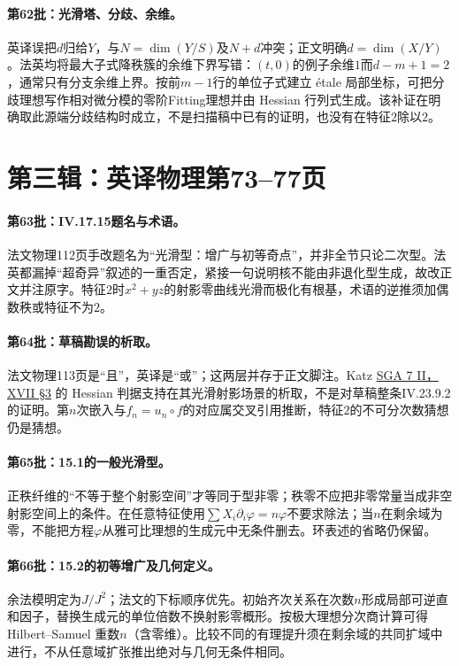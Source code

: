 \documentclass[UTF8,a4paper]{ctexbook}
\begin{document}
\paragraph{第62批：光滑塔、分歧、余维。}
英译误把$d$归给$Y$，与$N=\dim(Y/S)$及$N+d$冲突；正文明确$d=\dim(X/Y)$。法英均将最大子式降秩簇的余维下界写错：$(t,0)$的例子余维$1$而$d-m+1=2$，通常只有分支余维上界。按前$m-1$行的单位子式建立 étale 局部坐标，可把分歧理想写作相对微分模的零阶Fitting理想并由 Hessian 行列式生成。该补证在明确取此源端分歧结构时成立，不是扫描稿中已有的证明，也没有在特征$2$除以$2$。
\section*{第三辑：英译物理第73--77页}
\paragraph{第63批：IV.17.15题名与术语。}
法文物理112页手改题名为“光滑型：增广与初等奇点”，并非全节只论二次型。法英都漏掉“超奇异”叙述的一重否定，紧接一句说明核不能由非退化型生成，故改正文并注原字。特征$2$时$x^2+yz$的射影零曲线光滑而极化有根基，术语的逆推须加偶数秩或特征不为$2$。
\paragraph{第64批：草稿勘误的析取。}
法文物理113页是“且”，英译是“或”；这两层并存于正文脚注。Katz \href{https://grothendiecksga.com/read/sga7/fr/17-3.html}{SGA 7 II，XVII §3} 的 Hessian 判据支持在其光滑射影场景的析取，不是对草稿整条IV.23.9.2的证明。第$n$次嵌入与$f_n=u_n\circ f$的对应属交叉引用推断，特征$2$的不可分次数猜想仍是猜想。
\paragraph{第65批：15.1的一般光滑型。}
正秩纤维的“不等于整个射影空间”才等同于型非零；秩零不应把非零常量当成非空射影空间上的条件。在任意特征使用$\sum X_i\partial_i\varphi=n\varphi$不要求除法；当$n$在剩余域为零，不能把方程$\varphi$从雅可比理想的生成元中无条件删去。环表述的省略仍保留。
\paragraph{第66批：15.2的初等增广及几何定义。}
余法模明定为$J/J^2$；法文的下标顺序优先。初始齐次关系在次数$n$形成局部可逆直和因子，替换生成元的单位倍数不换射影零概形。按极大理想分次商计算可得 Hilbert--Samuel 重数$n$（含零维）。比较不同的有理提升须在剩余域的共同扩域中进行，不从任意域扩张推出绝对与几何无条件相同。
\end{document}
